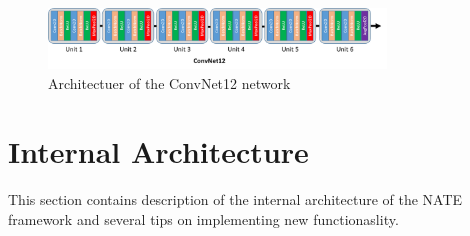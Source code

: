 \documentclass[a4paper, 11pt]{article}
\begin{document}
\begin{figure}
    \centering
    \includegraphics[width=0.8\textwidth]{img/convnet12.png}
    \caption{Architectuer of the ConvNet12 network}
    \label{convnet12}
\end{figure}

\section{Internal Architecture}
This section contains description of the internal architecture of the NATE framework and several tips on implementing new functionaslity.

\end{document}
